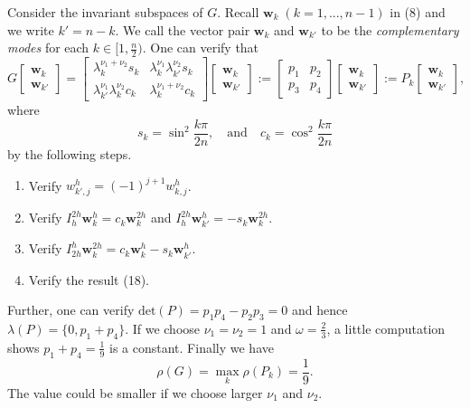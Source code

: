 \documentclass{SBCbookchapter}
\begin{document}
Consider the invariant subspaces of $G$. Recall $\mathbf{w}_k\;(k=1,...,n-1)$ in (8) and we write $k'=n-k$. We call the vector pair $\mathbf{w}_k$ and $\mathbf{w}_{k'}$ to be the \textit{complementary modes} for each $k\in[1,\frac{n}{2})$. One can verify that
\begin{equation}
	G\begin{bmatrix}
		\mathbf{w}_k\\
		\mathbf{w}_{k'}
	\end{bmatrix}=
	\begin{bmatrix}
		\lambda_k^{\nu_1+\nu_2}s_k & \lambda_k^{\nu_1}\lambda_{k'}^{\nu_2}s_k\\
		\lambda_{k'}^{\nu_1}\lambda_{k}^{\nu_2}c_k & \lambda_k^{\nu_1+\nu_2}c_k
	\end{bmatrix}
	\begin{bmatrix}
		\mathbf{w}_k\\
		\mathbf{w}_{k'}
	\end{bmatrix}:=
	\begin{bmatrix}
		p_1 & p_2\\
		p_3 & p_4
	\end{bmatrix}
	\begin{bmatrix}
		\mathbf{w}_k\\
		\mathbf{w}_{k'}
	\end{bmatrix}:=P_k
	\begin{bmatrix}
		\mathbf{w}_k\\
		\mathbf{w}_{k'}
	\end{bmatrix},
\end{equation}
where
\begin{equation}
	s_k=\sin^2\frac{k\pi}{2n},\quad \text{and} \quad c_k=\cos^2\frac{k\pi}{2n}
\end{equation}
by the following steps.
\begin{enumerate}[STEP 1.]
	\item Verify $w_{k',j}^h=(-1)^{j+1}w_{k,j}^h$.
	\item Verify $I_h^{2h}\textbf{w}_k^h=c_k\mathbf{w}_k^{2h}$ and $I_h^{2h}\textbf{w}_{k'}^h=-s_k\mathbf{w}_k^{2h}$.
	\item Verify $I_{2h}^h \mathbf{w}_k^{2h}=c_k\mathbf{w}_k^h-s_k\mathbf{w}_{k'}^h$.
	\item Verify the result (18).
\end{enumerate}
Further, one can verify $\text{det}(P)=p_1p_4-p_2p_3=0$ and hence $\lambda(P)=\{0,p_1+p_4\}$. If we choose $\nu_1=\nu_2=1$ and $\omega=\frac{2}{3}$, a little computation shows $p_1+p_4=\frac{1}{9}$ is a constant. Finally we have
\begin{equation}
	\rho(G)=\max_k \rho(P_k)=\frac{1}{9}.
\end{equation}
The value could be smaller if we choose larger $\nu_1$ and $\nu_2$.
\end{document}
